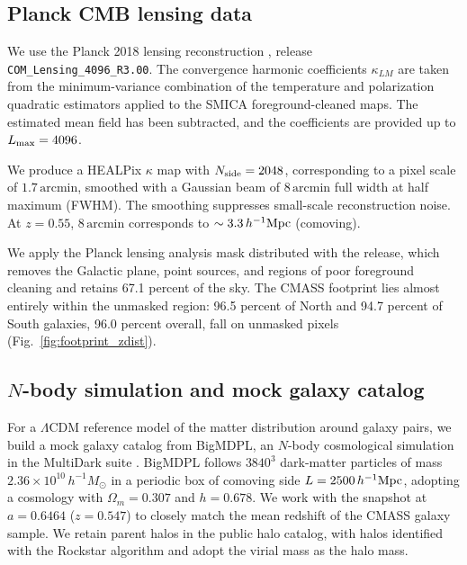 \documentclass[twocolumn,anonymous,linenumbers]{aastex701}
\newcommand{\hinvMpc}{h^{-1}{\rm Mpc}}
\newcommand{\hinvMsun}{h^{-1}M_\odot}
\begin{document}
\subsection{Planck CMB lensing data}
\label{sec:data_planck}

We use the Planck 2018 lensing reconstruction \citep{Planck2018lensing},
release \texttt{COM\_Lensing\_4096\_R3.00}. The convergence harmonic
coefficients $\kappa_{LM}$ are taken from the minimum-variance combination
of the temperature and polarization quadratic estimators applied to the
SMICA foreground-cleaned maps. The estimated mean field has been subtracted, and the coefficients are provided up to $L_{\rm max}=4096$. 

We produce a HEALPix \citep{Gorski2005} $\kappa$ map with $N_{\rm side}=2048$, corresponding to a pixel scale of $1.7\,\mathrm{arcmin}$, smoothed with a Gaussian beam of $8\,\mathrm{arcmin}$ full width at half maximum (FWHM). The smoothing suppresses small-scale reconstruction noise. At $z=0.55$, $8\,\mathrm{arcmin}$ corresponds to $\sim 3.3\,\hinvMpc$ (comoving). 

We apply the Planck lensing analysis mask distributed with the release,
which removes the Galactic plane, point sources, and regions of poor
foreground cleaning and retains 67.1 percent of the sky. 
The CMASS footprint lies almost entirely within the unmasked region: 
96.5 percent of North and 94.7 percent of South galaxies, 96.0 percent overall, 
fall on unmasked pixels (Fig.~\ref{fig:footprint_zdist}). 

\subsection{$N$-body simulation and mock galaxy catalog}
\label{sec:sim}

For a $\Lambda$CDM reference model of the matter distribution around galaxy pairs, 
we build a mock galaxy catalog from BigMDPL, an $N$-body cosmological simulation 
in the MultiDark suite \citep{Klypin2016, Riebe2013}. BigMDPL follows $3840^{3}$ 
dark-matter particles of mass $2.36\times10^{10}\,\hinvMsun$ in a periodic
box of comoving side $L=2500\,\hinvMpc$, adopting a cosmology with $\Omega_m=0.307$ and $h=0.678$. We work with the snapshot at $a=0.6464$ ($z=0.547$) to closely match the 
mean redshift of the CMASS galaxy sample. We retain parent halos in the public halo catalog, with halos identified with the Rockstar algorithm \citep{behroozi2012rockstar} and  adopt the virial mass as the halo mass. 
\end{document}
